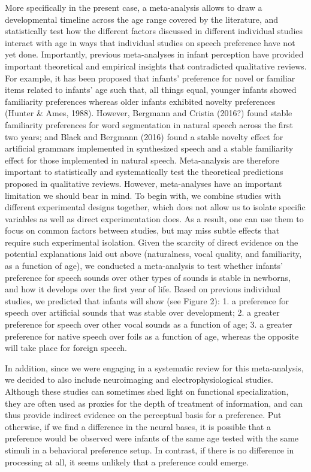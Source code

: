 \documentclass[man]{apa6}
\begin{document}
More specifically in the present case, a meta-analysis allows to draw a
developmental timeline across the age range covered by the literature,
and statistically test how the different factors discussed in different
individual studies interact with age in ways that individual studies on
speech preference have not yet done. Importantly, previous meta-analyses
in infant perception have provided important theoretical and empirical
insights that contradicted qualitative reviews. For example, it has been
proposed that infants' preference for novel or familiar items related to
infants' age such that, all things equal, younger infants showed
familiarity preferences whereas older infants exhibited novelty
preferences (Hunter \& Ames, 1988). However, Bergmann and Cristia
(2016?) found stable familiarity preferences for word segmentation in
natural speech across the first two years; and Black and Bergmann (2016)
found a stable novelty effect for artificial grammars implemented in
synthesized speech and a stable familiarity effect for those implemented
in natural speech. Meta-analysis are therefore important to
statistically and systematically test the theoretical predictions
proposed in qualitative reviews. However, meta-analyses have an
important limitation we should bear in mind. To begin with, we combine
studies with different experimental designs together, which does not
allow us to isolate specific variables as well as direct experimentation
does. As a result, one can use them to focus on common factors between
studies, but may miss subtle effects that require such experimental
isolation. Given the scarcity of direct evidence on the potential
explanations laid out above (naturalness, vocal quality, and
familiarity, as a function of age), we conducted a meta-analysis to test
whether infants' preference for speech sounds over other types of sounds
is stable in newborns, and how it develops over the first year of life.
Based on previous individual studies, we predicted that infants will
show (see Figure 2): 1. a preference for speech over artificial sounds
that was stable over development; 2. a greater preference for speech
over other vocal sounds as a function of age; 3. a greater preference
for native speech over foils as a function of age, whereas the opposite
will take place for foreign speech.

In addition, since we were engaging in a systematic review for this
meta-analysis, we decided to also include neuroimaging and
electrophysiological studies. Although these studies can sometimes shed
light on functional specialization, they are often used as proxies for
the depth of treatment of information, and can thus provide indirect
evidence on the perceptual basis for a preference. Put otherwise, if we
find a difference in the neural bases, it is possible that a preference
would be observed were infants of the same age tested with the same
stimuli in a behavioral preference setup. In contrast, if there is no
difference in processing at all, it seems unlikely that a preference
could emerge.
\end{document}
